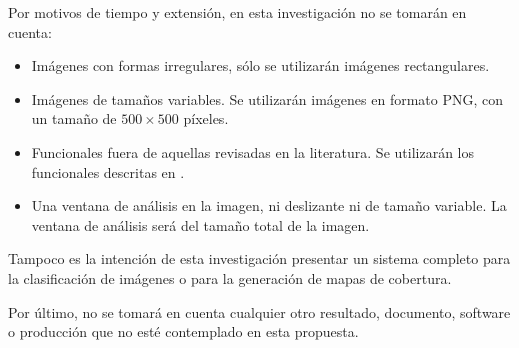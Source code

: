 Por motivos de tiempo y extensión, en esta investigación no se tomarán en cuenta:
\begin{itemize}
    \item Imágenes con formas irregulares, sólo se utilizarán imágenes rectangulares.
    \item Imágenes de tamaños variables. Se utilizarán imágenes en formato PNG, con un tamaño de $500 \times 500$ píxeles.
    \item Funcionales fuera de aquellas revisadas en la literatura. Se utilizarán los funcionales descritas en \cite{Petrou2007}.
    \item Una ventana de análisis en la imagen, ni deslizante ni de tamaño variable. La ventana de análisis será del tamaño total de la imagen.
\end{itemize}

Tampoco es la intención de esta investigación presentar un sistema completo para la clasificación de imágenes o para la generación de mapas de cobertura.

Por último, no se tomará en cuenta cualquier otro resultado, documento, software o producción que no esté contemplado en esta propuesta.
